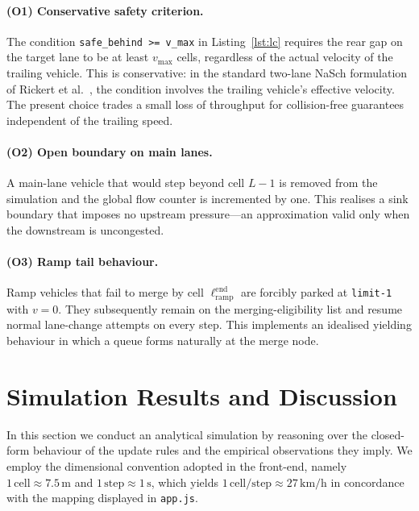 \documentclass[11pt,a4paper]{article}
\begin{document}
\paragraph{(O1) Conservative safety criterion.}
The condition \verb|safe_behind >= v_max| in
Listing~\ref{lst:lc} requires the rear gap on the target lane to be at
least $v_{\max}$ cells, regardless of the actual velocity of the
trailing vehicle. This is conservative: in the standard
two-lane NaSch formulation of Rickert et al.~\cite{rickert1996}, the
condition involves the trailing vehicle's effective velocity. The
present choice trades a small loss of throughput for collision-free
guarantees independent of the trailing speed.

\paragraph{(O2) Open boundary on main lanes.}
A main-lane vehicle that would step beyond cell $L-1$ is removed from
the simulation and the global flow counter is incremented by one. This
realises a sink boundary that imposes no upstream pressure---an
approximation valid only when the downstream is uncongested.

\paragraph{(O3) Ramp tail behaviour.}
Ramp vehicles that fail to merge by cell $\ell_{\text{ramp}}^{\text{end}}$
are forcibly parked at \verb|limit-1| with $v=0$. They subsequently
remain on the merging-eligibility list and resume normal lane-change
attempts on every step. This implements an idealised yielding behaviour
in which a queue forms naturally at the merge node.

\section{Simulation Results and Discussion}
\label{sec:results}

In this section we conduct an analytical simulation by reasoning over
the closed-form behaviour of the update rules and the empirical
observations they imply. We employ the dimensional convention adopted
in the front-end, namely $1\,\text{cell} \approx 7.5\,\text{m}$ and
$1\,\text{step} \approx 1\,\text{s}$, which yields
$1\,\text{cell/step} \approx 27\,\text{km/h}$ in concordance with the
mapping displayed in \texttt{app.js}.
\end{document}
